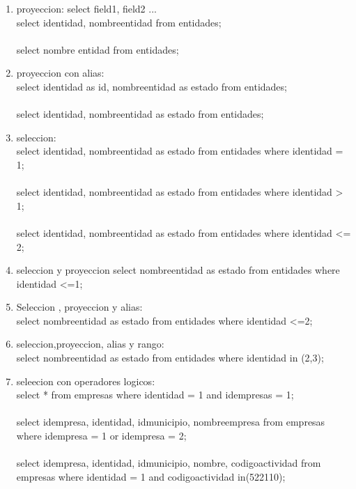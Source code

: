 \documentclass[10pt]{article}         %
\begin{document}
\begin{enumerate}
	\item proyeccion: select field1, field2 ...\\
		select identidad, nombreentidad from entidades;\\
		\\
		select nombre entidad from entidades;\\
	
	\item proyeccion con alias:\\
		select identidad as id, nombreentidad as estado from entidades;\\
		\\
		select identidad, nombreentidad as estado from entidades;
		
	\item seleccion:\\
		select identidad, nombreentidad as estado from entidades where identidad = 1;\\
		\\
		select identidad, nombreentidad as estado from entidades where identidad > 1;\\
		\\
		select identidad, nombreentidad as estado from entidades where identidad <= 2;\\
		
	\item seleccion  y proyeccion
		select nombreentidad as estado from entidades where identidad <=1;
		
	\item Seleccion , proyeccion y alias:\\
		select nombreentidad as estado from entidades where identidad <=2;
		
	\item seleccion,proyeccion, alias y rango:\\
		select nombreentidad as estado from entidades where identidad in (2,3);
		
	\item seleecion con operadores logicos:\\
		select * from empresas where identidad = 1 and idempresas = 1;\\
		\\
		select idempresa, identidad, idmunicipio, nombreempresa from empresas where idempresa = 1 or 		idempresa = 2;\\
		\\
		select idempresa, identidad, idmunicipio, nombre, codigoactividad from empresas where identidad = 1 and codigoactividad in(522110);
	

\end{enumerate}
\end{document}
